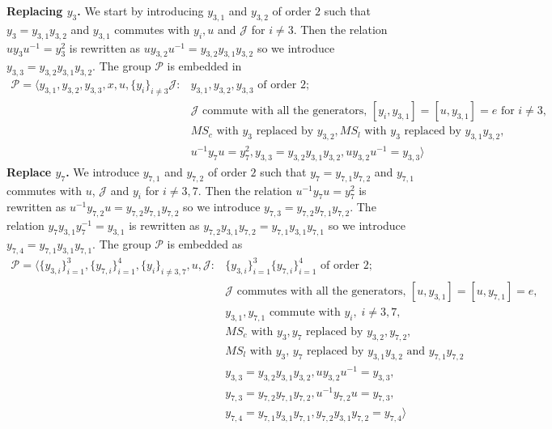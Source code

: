 \documentclass[11pt,letterpaper]{article}
\newcommand{\1}{\mathbb{1}}
\newcommand{\Pg}{\mathcal{P}}
\newcommand{\J}{\mathcal{J}}
\newcommand{\MS}{MS}
\theoremstyle{definition}
\begin{document}
\textbf{Replacing $y_3$.} We start by introducing $y_{3,1}$ and $y_{3,2}$ of order $2$ such that $y_3 = y_{3,1}y_{3,2}$ 
and $y_{3,1}$ commutes with $y_i,u$ and $\J$ for $ i \neq 3$.
Then the relation $uy_3u^{-1} = y_3^2$ is rewritten as $uy_{3,2}u^{-1} = y_{3,2}y_{3,1}y_{3,2}$ so we introduce $y_{3,3} = y_{3,2}y_{3,1}y_{3,2}$.
The group $\Pg$ is embedded in
\begin{equation}
\begin{aligned}
	\Pg = \langle y_{3,1}, y_{3,2}, y_{3,3}, x, u, \{y_i\}_{i \neq 3} \J: &y_{3,1},y_{3,2},y_{3,3} \text{ of order 2};\\
	&\J \text{ commute with  all the generators, } [y_i,y_{3,1}] = [u,y_{3,1}] =  e \text{ for } i \neq 3,\\
	&\MS_c \text{ with $y_3$ replaced by $y_{3,2}$},
	\MS_l \text{ with $y_3$ replaced by $y_{3,1}y_{3,2}$},\\
	& u^{-1}y_7u = y_7^2, 
	y_{3,3} = y_{3,2}y_{3,1}y_{3,2}, uy_{3,2}u^{-1} = y_{3,3}\rangle
\end{aligned}
\end{equation}
\textbf{Replace $y_7$.} We introduce $y_{7,1}$ and $y_{7,2}$ of order $2$ such that $y_7 = y_{7,1}y_{7,2}$ and 
$y_{7,1}$ commutes with $u$, $\J$ and $y_i$ for $i \neq 3,7$.
Then the relation $u^{-1}y_7u = y_7^2$ is rewritten as $u^{-1}y_{7,2}u = y_{7,2}y_{7,1}y_{7,2}$ so we introduce $y_{7,3} = y_{7,2}y_{7,1}y_{7,2}$.
The relation $y_7y_{3,1}y_7^{-1} = y_{3,1}$ is rewritten as $y_{7,2}y_{3,1}y_{7,2} = y_{7,1}y_{3,1}y_{7,1}$ so we introduce $y_{7,4} = y_{7,1}y_{3,1}y_{7,1}$.
The group $\Pg$ is embedded as
\begin{equation}
\begin{aligned}
	\Pg = \langle \{y_{3,i}\}_{i=1}^3, \{ y_{7,i} \}_{i=1}^4, \{y_i\}_{i\neq 3, 7}, u, \J: &\{y_{3,i}\}_{i=1}^3 \{y_{7,i}\}_{i=1}^4 \text{ of order } 2;\\
	&\J \text{ commutes with all the generators, } [u, y_{3,1}] = [u, y_{7,1}] = e,\\
	&y_{3,1}, y_{7,1} \text{ commute with } y_i,\; i \neq 3,7,\\
	& \MS_c \text{ with $y_3, y_7$ replaced by $y_{3,2}, y_{7,2}$},\\
	& \MS_l \text{ with $y_3$, $y_7$ replaced by $y_{3,1}y_{3,2}$ and $y_{7,1}y_{7,2}$} \\
	&y_{3,3} = y_{3,2}y_{3,1}y_{3,2}, uy_{3,2}u^{-1} = y_{3,3}, \\
	&y_{7,3} = y_{7,2}y_{7,1}y_{7,2}, u^{-1}y_{7,2}u = y_{7,3},\\
	&y_{7,4} = y_{7,1}y_{3,1}y_{7,1}, y_{7,2}y_{3,1}y_{7,2} = y_{7,4} \rangle
\end{aligned}
\end{equation}
\end{document}
